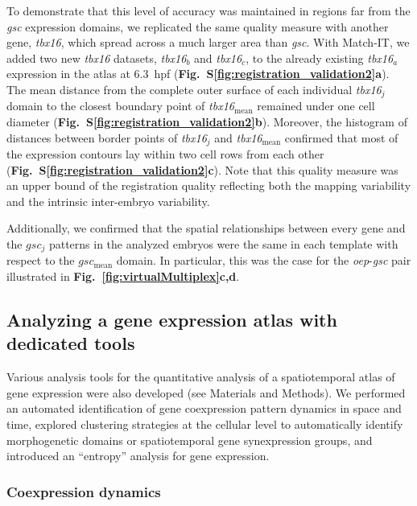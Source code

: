 To demonstrate that this level of accuracy was maintained in regions far from the \emph{gsc} expression domains, we replicated the same quality measure with another gene, \emph{tbx16}, which spread across a much larger area than \emph{gsc}. With Match-IT, we added two new \emph{tbx16} datasets, \emph{tbx16}$_b$ and \emph{tbx16}$_c$, to the already existing \emph{tbx16}$_a$ expression in the atlas at 6.3~hpf (\textbf{Fig.~S\ref{fig:registration_validation2}a}). The mean distance from the complete outer surface of each individual \emph{tbx16}$_j$ domain to the closest boundary point of \emph{tbx16}$_\mathrm{mean}$ remained under one cell diameter (\textbf{Fig.~S\ref{fig:registration_validation2}b}). Moreover, the histogram of distances between border points of \emph{tbx16}$_j$ and \emph{tbx16}$_\mathrm{mean}$ confirmed that most of the expression contours lay within two cell rows from each other (\textbf{Fig.~S\ref{fig:registration_validation2}c}). Note that this quality measure was an upper bound of the registration quality reflecting both the mapping variability and the intrinsic inter-embryo variability.



Additionally, we confirmed that the spatial relationships between every gene and the $gsc_j$ patterns in the analyzed embryos were the same in each template with respect to the $gsc_\mathrm{mean}$ domain. In particular, this was the case for the \emph{oep}-\emph{gsc} pair illustrated in \textbf{Fig.~\ref{fig:virtualMultiplex}c,d}.



\subsection*{Analyzing a gene expression atlas with dedicated tools}

\label{subsec:BiologicalInsights}



Various analysis tools for the quantitative analysis of a spatiotemporal atlas of gene expression were also developed (see Materials and Methods). We performed an automated identification of gene coexpression pattern dynamics in space and time, explored clustering strategies at the cellular level to automatically identify morphogenetic domains or spatiotemporal gene synexpression groups, and introduced an ``entropy'' analysis for gene expression.



\subsubsection*{Coexpression dynamics}




